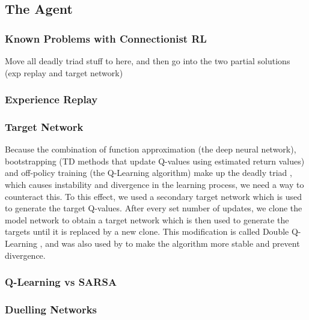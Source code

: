 

\subsection{The Agent}\label{sec:agent}


\subsubsection{Known Problems with Connectionist RL}\label{sec:problems}
Move all deadly triad stuff to here, and then go into the two partial solutions (exp replay and target network)

\subsubsection{Experience Replay}\label{sec:exp_replay}

\subsubsection{Target Network}\label{sec:target_network}
Because the combination of function approximation (the deep neural network), bootstrapping (TD methods that update Q-values using estimated return values) and off-policy training (the Q-Learning algorithm) make up the deadly triad \citep{sutton_barto_2018}, which causes instability and divergence in the learning process, we need a way to counteract this. To this effect, we used a secondary target network which is used to generate the target Q-values. After every set number of updates, we clone the model network to obtain a target network which is then used to generate the targets until it is replaced by a new clone. This modification is called Double Q-Learning \citep{NIPS2010_3964}, and was also used by \citep{mnih2015human} to make the algorithm more stable and prevent divergence.

\subsubsection{Q-Learning vs SARSA}\label{sec:ql_sarsa}

\subsubsection{Duelling Networks}\label{sec:duelling}

